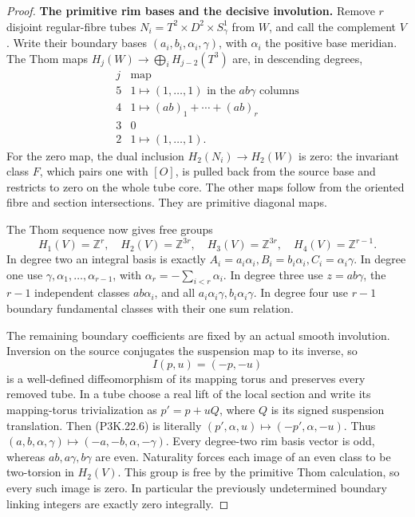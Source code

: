\begin{proof}
\par\medskip\noindent\textbf{The primitive rim bases and the decisive involution.}\enspace
Remove \(r\) disjoint regular-fibre tubes
\(N_i=T^2\times D^2\times S^1_\gamma\) from \(W\), and call
the complement \(V\).  Write their boundary bases
\((a_i,b_i,\alpha_i,\gamma)\), with \(\alpha_i\) the positive
base meridian.  The Thom maps
\(H_j(W)\to\bigoplus_iH_{j-2}(T^3)\) are, in descending degrees,
\[
 \begin{array}{c|c}
 j&\text{map}\\\hline
 5&1\longmapsto(1,\ldots,1)\text{ in the }ab\gamma\text{ columns}\\
 4&1\longmapsto(ab)_1+\cdots+(ab)_r\\
 3&0\\
 2&1\longmapsto(1,\ldots,1).
 \end{array}                                                     \tag{P3K.22.5}
\]
For the zero map, the dual inclusion \(H_2(N_i)\to H_2(W)\)
is zero: the invariant class \(F\), which pairs one with \([O]\),
is pulled back from the source base and restricts to zero on the
whole tube core.  The other maps follow from the oriented fibre and
section intersections.  They are primitive diagonal maps.

The Thom sequence now gives free groups
\[
 H_1(V)=\mathbb Z^r,\quad H_2(V)=\mathbb Z^{3r},
 \quad H_3(V)=\mathbb Z^{3r},\quad H_4(V)=\mathbb Z^{r-1}.
\]
In degree two an integral basis is exactly
\(A_i=a_i\alpha_i,B_i=b_i\alpha_i,C_i=\alpha_i\gamma\).
In degree one use \(\gamma,\alpha_1,\ldots,\alpha_{r-1}\), with
\(\alpha_r=-\sum_{i<r}\alpha_i\).  In degree three use
\(z=ab\gamma\), the \(r-1\) independent classes \(ab\alpha_i\),
and all \(a_i\alpha_i\gamma,b_i\alpha_i\gamma\).  In degree four
use \(r-1\) boundary fundamental classes with their one sum relation.

The remaining boundary coefficients are fixed by an actual smooth
involution.  Inversion on the source conjugates the suspension map
to its inverse, so
\[
                         I(p,u)=(-p,-u)                         \tag{P3K.22.6}
\]
is a well-defined diffeomorphism of its mapping torus and preserves
every removed tube.  In a tube choose a real lift of the local
section and write its mapping-torus trivialization as
\(p'=p+uQ\), where \(Q\) is its signed suspension translation.
Then (P3K.22.6) is literally \((p',\alpha,u)\mapsto(-p',\alpha,-u)\).
Thus \((a,b,\alpha,\gamma)\mapsto(-a,-b,\alpha,-\gamma)\).
Every degree-two rim basis vector is odd, whereas
\(ab,a\gamma,b\gamma\) are even.  Naturality forces each image
of an even class to be two-torsion in \(H_2(V)\).  This group is
free by the primitive Thom calculation, so every such image is zero.
In particular the previously undetermined boundary linking integers
are exactly zero integrally.


\end{proof}
